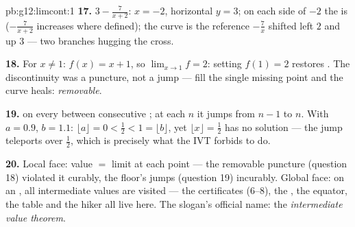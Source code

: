 \begin{solution}{pb:g12:limcont:1}
\textbf{17.} $3 - \frac{7}{x + 2}$: 
$x = -2$, horizontal $y = 3$; on each side of $-2$ the
 is  ($-\frac{7}{x+2}$ increases where
defined); the curve is the reference 
$-\frac7x$ shifted left $2$ and up $3$ --- two branches
hugging the  cross.

\textbf{18.} For $x \neq 1$: $f(x) = x + 1$, so
$\lim_{x \to 1} f = 2$: setting $f(1) = 2$ restores
. The discontinuity was a puncture, not a jump ---
fill the single missing point and the curve heals:
\emph{removable}.

\textbf{19.}  on every  between consecutive
; at each  $n$ it jumps from $n - 1$ to $n$.
With $a = 0.9$, $b = 1.1$: $\lfloor a \rfloor = 0 < \frac12 <
1 = \lfloor b \rfloor$, yet $\lfloor x \rfloor = \frac12$ has
no solution --- the jump teleports over $\frac12$, which is
precisely what the IVT forbids   to do.

\textbf{20.} Local face: value $=$ limit at each point ---
the removable puncture (question 18) violated it curably, the
floor's jumps (question 19) incurably. Global face: on an
, all intermediate values are visited --- the 
certificates (6--8), the , the equator, the table
and the hiker all live here. The slogan's official name: the
\emph{intermediate value theorem}.
\end{solution}
